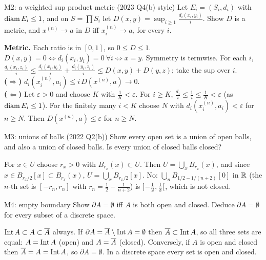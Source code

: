 \begin{exam}{M2: a weighted sup product metric (2023 Q4(b) style)}
Let $E_i=(S_i,d_i)$ with $\operatorname{diam} E_i\le1$, and on $S=\prod S_i$ let
$D(x,y)=\sup_{i\ge1}\frac{d_i(x_i,y_i)}{i}$. Show $D$ is a metric, and $x^{(n)}\to a$ in $D$ iff
$x^{(n)}_i\to a_i$ for every $i$.
\end{exam}
\begin{answer}
\textbf{Metric.} Each ratio is in $[0,1]$, so $0\le D\le1$. $D(x,y)=0\iff d_i(x_i,y_i)=0\ \forall
i\iff x=y$. Symmetry is termwise. For each $i$,
$\frac{d_i(x_i,z_i)}i\le\frac{d_i(x_i,y_i)}i+\frac{d_i(y_i,z_i)}i\le D(x,y)+D(y,z)$; take the sup
over $i$.\\
\textbf{($\Rightarrow$)} $d_i(x^{(n)}_i,a_i)\le i\,D(x^{(n)},a)\to0$.\\
\textbf{($\Leftarrow$)} Let $\varepsilon>0$ and choose $K$ with $\frac1K<\varepsilon$. For
$i\ge K$, $\frac{d_i}{i}\le\frac1i\le\frac1K<\varepsilon$ (as $\operatorname{diam} E_i\le1$). For the finitely
many $i<K$ choose $N$ with $d_i(x^{(n)}_i,a_i)<\varepsilon$ for $n\ge N$. Then
$D(x^{(n)},a)\le\varepsilon$ for $n\ge N$.
\end{answer}

\begin{exam}{M3: unions of balls (2022 Q2(b))}
Show every open set is a union of open balls, and also a union of closed balls. Is every union of
closed balls closed?
\end{exam}
\begin{answer}
For $x\in U$ choose $r_x>0$ with $B_{r_x}(x)\subset U$. Then
$U=\bigcup_xB_{r_x}(x)$, and since $x\in B_{r_x/2}[x]\subset B_{r_x}(x)$,
$U=\bigcup_xB_{r_x/2}[x]$. No: $\bigcup_n B_{1/2-1/(n+2)}[0]$ in $\mathbb R$ (the $n$-th set is
$[-r_n,r_n]$ with $r_n=\frac12-\frac1{n+2}$) is $\mathopen{]}-\frac12,\frac12\mathclose{[}$, which is not closed.
\end{answer}

\begin{exam}{M4: empty boundary}
Show $\partial A=\emptyset$ iff $A$ is both open and closed. Deduce $\partial A=\emptyset$ for
every subset of a discrete space.
\end{exam}
\begin{answer}
$\operatorname{Int} A\subset A\subset\overline{A}$ always. If $\partial A=\overline{A}\setminus\operatorname{Int} A=\emptyset$ then
$\overline{A}\subset\operatorname{Int} A$, so all three sets are equal: $A=\operatorname{Int} A$ (open) and $A=\overline{A}$ (closed).
Conversely, if $A$ is open and closed then $\overline{A}=A=\operatorname{Int} A$, so $\partial A=\emptyset$. In a
discrete space every set is open and closed.
\end{answer}

